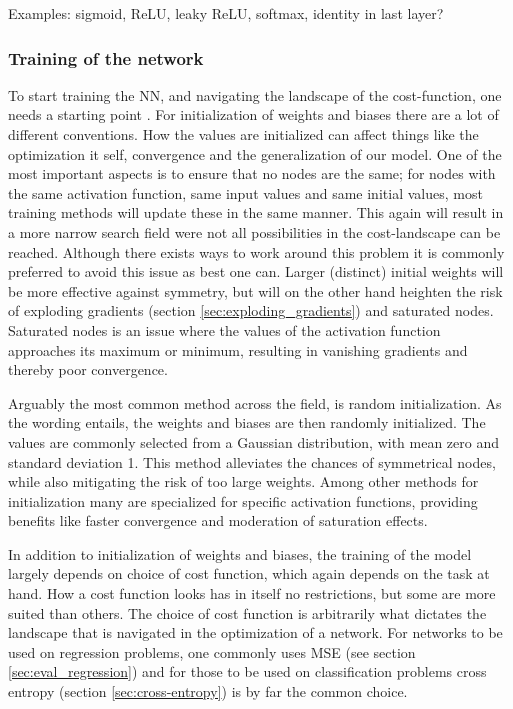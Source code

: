 Examples: sigmoid, ReLU, leaky ReLU, softmax, identity in last layer?

\subsubsection{Training of the network}

To start training the NN, and navigating the landscape of the cost-function, one needs a starting point \citep[p.297]{Goodfellow-et-al-2016}. For initialization of weights and biases there are a lot of different conventions. How the values are initialized can affect things like the optimization it self, convergence and the generalization of our model. One of the most important aspects is to ensure that no nodes are the same; for nodes with the same activation function, same input values and same initial values, most training methods will update these in the same manner. This again will result in a more narrow search field were not all possibilities in the cost-landscape can be reached. Although there exists ways to work around this problem it is commonly preferred to avoid this issue as best one can. Larger (distinct) initial weights will be more effective against symmetry, but will on the other hand heighten the risk of exploding gradients (section \ref{sec:exploding_gradients}) and saturated nodes. Saturated nodes is an issue where the values of the activation function approaches its maximum or minimum, resulting in vanishing gradients and thereby poor convergence. 

Arguably the most common method across the field, is random initialization. As the wording entails, the weights and biases are then randomly initialized. The values are commonly selected from a Gaussian distribution, with mean zero and standard deviation 1. This method alleviates the chances of symmetrical nodes, while also mitigating the risk of too large weights. Among other methods for initialization many are specialized for specific activation functions, providing benefits like faster convergence and moderation of saturation effects. 

In addition to initialization of weights and biases, the training of the model largely depends on choice of cost function, which again depends on the task at hand. How a cost function looks has in itself no restrictions, but some are more suited than others. 
The choice of cost function is arbitrarily what dictates the landscape that is navigated in the optimization of a network. 
For networks to be used on regression problems, one commonly uses MSE (see section \ref{sec:eval_regression}) and for those to be used on classification problems cross entropy (section \ref{sec:cross-entropy}) is by far the common choice. 

